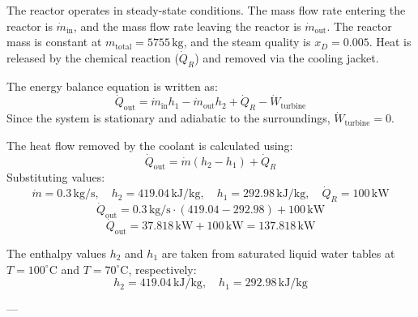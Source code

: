 The reactor operates in steady-state conditions. The mass flow rate entering the reactor is \( \dot{m}_{\text{in}} \), and the mass flow rate leaving the reactor is \( \dot{m}_{\text{out}} \). The reactor mass is constant at \( m_{\text{total}} = 5755 \, \text{kg} \), and the steam quality is \( x_D = 0.005 \). Heat is released by the chemical reaction (\( \dot{Q}_R \)) and removed via the cooling jacket.  

The energy balance equation is written as:  
\[
\dot{Q}_{\text{out}} = \dot{m}_{\text{in}} h_1 - \dot{m}_{\text{out}} h_2 + \dot{Q}_R - \dot{W}_{\text{turbine}}
\]  
Since the system is stationary and adiabatic to the surroundings, \( \dot{W}_{\text{turbine}} = 0 \).  

The heat flow removed by the coolant is calculated using:  
\[
\dot{Q}_{\text{out}} = \dot{m} (h_2 - h_1) + \dot{Q}_R
\]  
Substituting values:  
\[
\dot{m} = 0.3 \, \text{kg/s}, \quad h_2 = 419.04 \, \text{kJ/kg}, \quad h_1 = 292.98 \, \text{kJ/kg}, \quad \dot{Q}_R = 100 \, \text{kW}
\]  
\[
\dot{Q}_{\text{out}} = 0.3 \, \text{kg/s} \cdot (419.04 - 292.98) + 100 \, \text{kW}
\]  
\[
\dot{Q}_{\text{out}} = 37.818 \, \text{kW} + 100 \, \text{kW} = 137.818 \, \text{kW}
\]  

The enthalpy values \( h_2 \) and \( h_1 \) are taken from saturated liquid water tables at \( T = 100^\circ\text{C} \) and \( T = 70^\circ\text{C} \), respectively:  
\[
h_2 = 419.04 \, \text{kJ/kg}, \quad h_1 = 292.98 \, \text{kJ/kg}
\]  

---